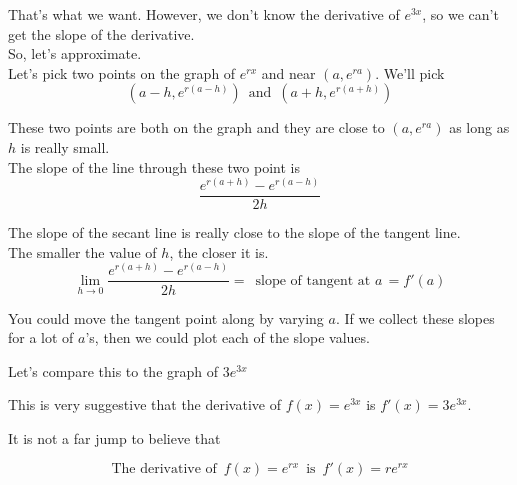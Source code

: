 \documentclass{ximera}
\begin{document}
That's what we want.  However, we don't know the derivative of $e^{3 x}$, so we can't get the slope of the derivative. \\

So, let's approximate. \\



Let's pick two points on the graph of $e^{r x}$ and near $(a, e^{r a})$.  We'll pick
\[
(a-h, e^{r(a-h)}) \, \text{ and } \, (a+h, e^{r(a+h)})
\]

These two points are both on the graph and they are close to $(a, e^{r a})$ as long as $h$ is really small. \\

The slope of the line through these two point is 
\[
\frac{e^{r(a+h)} - e^{r(a-h)}}{2h}
\]





\begin{center}
\end{center}



The slope of the secant line is really close to the slope of the tangent line. \\

The smaller the value of $h$, the closer it is. \\


\[
\lim_{h \to 0} \frac{e^{r(a+h)} - e^{r(a-h)}}{2h} = \, \text{ slope of tangent at }a \, = f'(a)
\]


You could move the tangent point along by varying $a$.  If we collect these slopes for a lot of $a$'s, then we could plot each of the slope values.

Let's compare this to the graph of $3 e^{3 x}$










\begin{center}
\end{center}



This is very suggestive that the derivative of $f(x) = e^{3 x}$ is $f'(x) = 3 e^{3 x}$.

It is not a far jump to believe that 



\[
\text{The derivative of } \, f(x) = e^{r x} \, \text{ is } \, f'(x) = r e^{r x}
\]
\end{document}
